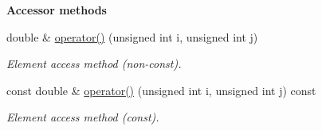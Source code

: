 \begin{Indent}{\bf Accessor methods}\par
\begin{DoxyCompactItemize}
\item 
double \& \hyperlink{class_q_u_e_s_o_1_1_gsl_matrix_a586cc2a821944a87a95878e14150a924}{operator()} (unsigned int i, unsigned int j)
\begin{DoxyCompactList}\small\item\em Element access method (non-\/const). \end{DoxyCompactList}\item 
const double \& \hyperlink{class_q_u_e_s_o_1_1_gsl_matrix_a4afb522876a52b8ad83413bf14a595ef}{operator()} (unsigned int i, unsigned int j) const 
\begin{DoxyCompactList}\small\item\em Element access method (const). \end{DoxyCompactList}\end{DoxyCompactItemize}
\end{Indent}
